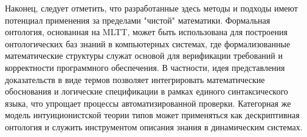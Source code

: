\documentclass[14pt]{extarticle}
\begin{document}
	Наконец, следует отметить, что разработанные здесь методы и подходы имеют потенциал применения за пределами "чистой" математики. Формальная онтология, основанная на MLTT, может быть использована для построения онтологических баз знаний в компьютерных системах, где формализованные математические структуры служат основой для верификации требований и корректности программного обеспечения. В частности, идея представления доказательств в виде термов позволяет интегрировать математические обоснования и логические спецификации в рамках единого синтаксического языка, что упрощает процессы автоматизированной проверки. Категорная же модель интуиционистской теории типов может применяться как дескриптивная онтология и служить инструментом описания знания в динамическим системах.
	
	\newpage
	
	\printbibliography[heading=bibintoc,title={Список литературы}]
	
\end{document}
